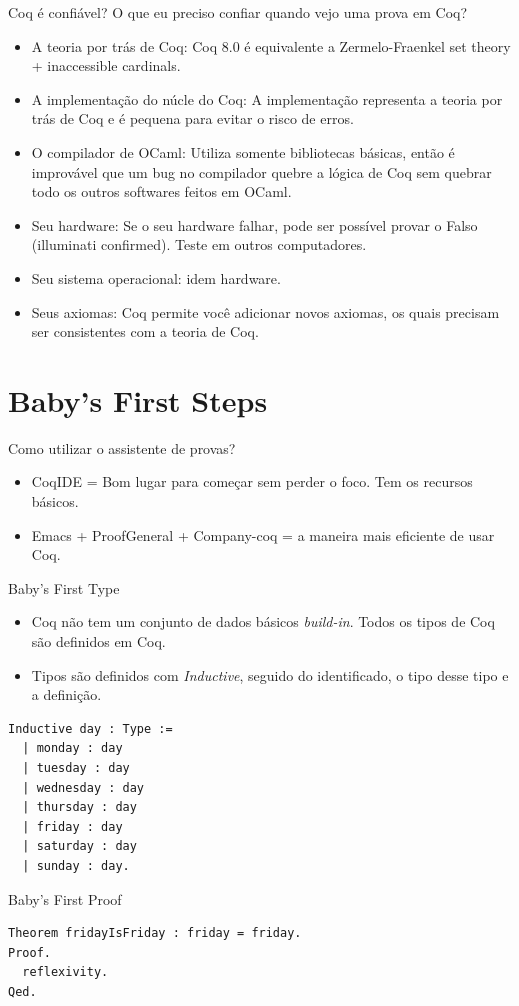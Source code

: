 \documentclass[presentation]{beamer}
\begin{document}
\begin{frame}[label={sec:org9ac2dc0}]{Coq é confiável?}
O que eu preciso confiar quando vejo uma prova em Coq? 
\begin{itemize}
\item \alert{A teoria por trás de Coq}: Coq 8.0 é equivalente a Zermelo-Fraenkel set theory + inaccessible cardinals.
\item \alert{A implementação do núcle do Coq}: A implementação representa a teoria por trás de Coq e é pequena para evitar o risco de erros.
\item \alert{O compilador de OCaml}: Utiliza somente bibliotecas básicas, então é improvável que um bug no compilador quebre a lógica de Coq sem quebrar todo os outros softwares feitos em OCaml.
\item \alert{Seu hardware}: Se o seu hardware falhar, pode ser possível provar o Falso (illuminati confirmed). Teste em outros computadores.
\item \alert{Seu sistema operacional}: idem hardware.
\item \alert{Seus axiomas}: Coq permite você adicionar novos axiomas, os quais precisam ser consistentes com a teoria de Coq.
\end{itemize}
\end{frame}

\section{Baby's First Steps}
\label{sec:orga1a4ebf}

\begin{frame}[label={sec:orge7ae83a}]{Como utilizar o assistente de provas?}
\begin{itemize}
\item CoqIDE = Bom lugar para começar sem perder o foco. Tem os recursos básicos.
\item Emacs + ProofGeneral + Company-coq = a maneira mais eficiente de usar Coq.
\end{itemize}
\end{frame}

\begin{frame}[fragile,label={sec:orgde61ba7}]{Baby's First Type}
 \begin{itemize}
\item Coq não tem um conjunto de dados básicos \emph{build-in}. Todos os tipos de Coq são definidos em Coq.
\item Tipos são definidos com \emph{Inductive}, seguido do identificado, o tipo desse tipo e a definição.
\end{itemize}
\begin{verbatim}
Inductive day : Type :=
  | monday : day
  | tuesday : day
  | wednesday : day
  | thursday : day
  | friday : day
  | saturday : day
  | sunday : day.
\end{verbatim}
\end{frame}

\begin{frame}[fragile,label={sec:org37b9699}]{Baby's First Proof}
 \begin{verbatim}
Theorem fridayIsFriday : friday = friday.
Proof.
  reflexivity.
Qed.
\end{verbatim}
\end{frame}
\end{document}
